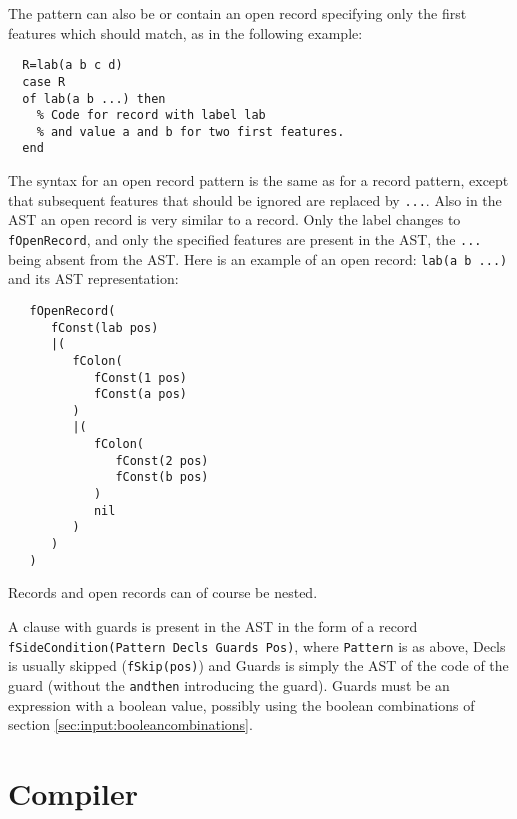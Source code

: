 \documentclass[a4paper]{memoir}
\begin{document}
The pattern can also be or contain an open record specifying only the first features which should match, as in the following example:
\begin{lstlisting}
  R=lab(a b c d)
  case R
  of lab(a b ...) then
    % Code for record with label lab
    % and value a and b for two first features.
  end
\end{lstlisting}
The syntax for an open record pattern is the same as for a record pattern, except that subsequent features that should be ignored are replaced by \lstinline!...!. Also in the AST an open record is very similar to a record. Only the label changes to \lstinline!fOpenRecord!, and only the specified features are present in the AST, the \lstinline!...! being absent from the AST. Here is an example of an open record:
\lstinline!lab(a b ...)! 
and its AST representation:
\begin{lstlisting}
   fOpenRecord(
      fConst(lab pos)
      |(
         fColon(
            fConst(1 pos)
            fConst(a pos)
         )
         |(
            fColon(
               fConst(2 pos)
               fConst(b pos)
            )
            nil
         )
      )
   )
\end{lstlisting}

Records and open records can of course be nested.

A clause with guards is present in the AST in the form of a record \lstinline!fSideCondition(Pattern Decls Guards Pos)!, where \lstinline!Pattern! is as above, Decls is usually skipped (\lstinline!fSkip(pos)!)%
and Guards is simply the AST of the code of the guard (without the \lstinline!andthen! introducing the guard).
Guards must be an expression with a boolean value, possibly using the boolean combinations of section \ref{sec:input:booleancombinations}.



\chapter{Compiler}
\end{document}
